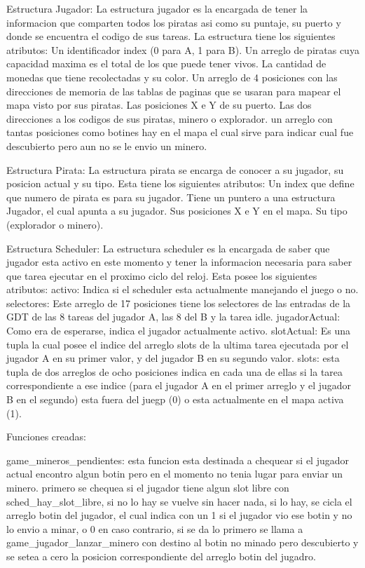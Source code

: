 Estructura Jugador:
    La estructura jugador es la encargada de tener la informacion que comparten todos los piratas asi como
    su puntaje, su puerto y donde se encuentra el codigo de sus tareas.
    La estructura tiene los siguientes atributos:
      Un identificador index (0 para A, 1 para B).
      Un arreglo de piratas cuya capacidad maxima es el total de los que puede tener vivos.
      La cantidad de monedas que tiene recolectadas y su color.
      Un arreglo de 4 posiciones con las direcciones de memoria de las tablas de paginas que se usaran para mapear el mapa visto por
      sus piratas.
      Las posiciones X e Y de su puerto.
      Las dos direcciones a los codigos de sus piratas, minero o explorador.
      un arreglo con tantas posiciones como botines hay en el mapa el cual sirve para indicar cual fue descubierto pero aun no se le envio
      un minero.

Estructura Pirata:
    La estructura pirata se encarga de conocer a su jugador, su posicion actual y su tipo.
    Esta tiene los siguientes atributos:
      Un index que define que numero de pirata es para su jugador.
      Tiene un puntero a una estructura Jugador, el cual apunta a su jugador.
      Sus posiciones X e Y en el mapa.
      Su tipo (explorador o minero).

Estructura Scheduler:
    La estructura scheduler es la encargada de saber que jugador esta activo en este momento y tener la informacion
    necesaria para saber que tarea ejecutar en el proximo ciclo del reloj.
    Esta posee los siguientes atributos:
      activo: Indica si el scheduler esta actualmente manejando el juego o no.
      selectores: Este arreglo de 17 posiciones tiene los selectores de las entradas de la GDT de
      las 8 tareas del jugador A, las 8 del B y la tarea idle.
      jugadorActual: Como era de esperarse, indica el jugador actualmente activo.
      slotActual: Es una tupla la cual posee el indice del arreglo slots de la ultima tarea ejecutada por el jugador A
      en su primer valor, y del jugador B en su segundo valor.
      slots: esta tupla de dos arreglos de ocho posiciones indica en cada una de ellas si la tarea correspondiente a ese
      indice (para el jugador A en el primer arreglo y el jugador B en el segundo) esta fuera del juegp (0) o esta actualmente
      en el mapa activa (1).

Funciones creadas:

game_mineros_pendientes:
    esta funcion esta destinada a chequear si el jugador actual encontro algun botin pero en el momento no tenia lugar para enviar
    un minero.
    primero se chequea si el jugador tiene algun slot libre con sched_hay_slot_libre, si no lo hay se vuelve sin hacer nada,
    si lo hay, se cicla el arreglo botin del jugador, el cual indica con un 1 si el jugador vio ese botin y no lo envio a minar, o
    0 en caso contrario, si se da lo primero se llama a game_jugador_lanzar_minero con destino al botin no minado pero descubierto
    y se setea a cero la posicion correspondiente del arreglo botin del jugadro.

